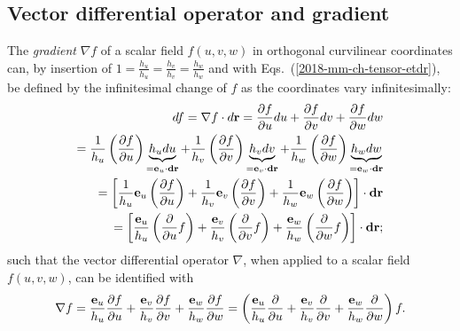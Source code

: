 \subsection{Vector differential operator and gradient}

The {\em gradient} $\nabla f$ of a scalar field $f(u,v,w)$ in orthogonal curvilinear coordinates can,
by insertion of $1=\frac{h_u}{h_u}=\frac{h_v}{h_v}=\frac{h_w}{h_w}$ and
with Eqs.~(\ref{2018-mm-ch-tensor-etdr}), be defined by
the infinitesimal change of $f$  as the coordinates vary infinitesimally:
\begin{equation}
\begin{split}
df =\nabla f \cdot d {\bf r} =
\frac{\partial f}{\partial u} du +
\frac{\partial f}{\partial v} dv +
\frac{\partial f}{\partial w} dw
\\
=
\frac{1}{h_u} \left(\frac{\partial f}{\partial u}\right) \underbrace{h_u du}_{={\bf e}_u \cdot {\bf dr}} +
\frac{1}{h_v} \left(\frac{\partial f}{\partial v}\right) \underbrace{h_v dv}_{={\bf e}_v \cdot {\bf dr}}  +
\frac{1}{h_w} \left(\frac{\partial f}{\partial w}\right) \underbrace{h_w dw}_{={\bf e}_w \cdot {\bf dr}}
\\
=
\left[
\frac{1}{h_u}  {\bf e}_u \left(\frac{\partial f}{\partial u}\right)     +
\frac{1}{h_v}  {\bf e}_v \left(\frac{\partial f}{\partial v}\right)      +
\frac{1}{h_w}  {\bf e}_w \left(\frac{\partial f}{\partial w}\right)   \right]
\cdot {\bf dr}
\\
=
\left[
\frac{{\bf e}_u}{h_u}  \left(\frac{\partial  }{\partial u} f \right)  +
\frac{{\bf e}_v}{h_v}  \left(\frac{\partial  }{\partial v} f \right)    +
\frac{{\bf e}_w}{h_w}  \left(\frac{\partial  }{\partial w} f \right)
\right]
\cdot {\bf dr}
;
\end{split}
\label{2018-mm-ch-del}
\end{equation}
such that the vector differential operator $\nabla$, when applied to a scalar field $f(u,v,w)$,
can be identified with
\begin{equation}
\begin{split}
 \nabla  f
=
\frac{{\bf e}_u}{h_u}  \frac{\partial  f}{\partial u}    +
\frac{{\bf e}_v}{h_v}  \frac{\partial  f}{\partial v}      +
\frac{{\bf e}_w}{h_w} \frac{\partial  f}{\partial w}
=
\left(
\frac{{\bf e}_u}{h_u}  \frac{\partial   }{\partial u}    +
\frac{{\bf e}_v}{h_v}  \frac{\partial   }{\partial v}      +
\frac{{\bf e}_w}{h_w} \frac{\partial   }{\partial w}
\right) f
.
\end{split}
\label{2018-mm-ch-veo}
\end{equation}

